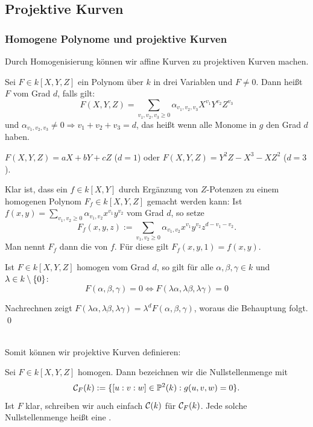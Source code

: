 \nextlecture
\newpage
\subsection{Projektive Kurven}
\subsubsection{Homogene Polynome und projektive Kurven}
\label{sub:2.3} \label{subsub:2.3.1}
	Durch Homogenisierung können wir affine Kurven zu projektiven Kurven machen. 
	\marginnote{[9]}
	
\begin{defn}
	Sei $F \in k[X,Y,Z]$ ein Polynom über $k$ in drei Variablen und $F \neq 0$. 
	Dann heißt $F$  vom Grad $d$, falls gilt:
	\[ F(X,Y,Z) = \sum_{v_1,v_2,v_3 \geq 0} \alpha_{v_1,v_2,v_3} X^{v_1} Y^{v_2} Z^{v_3} \]
	und $\alpha_{v_1,v_2,v_3} \neq 0 \Rightarrow v_1 + v_2 + v_3 = d$, das heißt wenn alle Monome in $g$ den Grad $d$ haben.
\end{defn}

\begin{bsp}
	$F(X,Y,Z) = aX + bY + cZ$ ($d=1$) oder $F(X,Y,Z) = Y^2Z-X^3-XZ^2$ ($d=3$).
\end{bsp}

\begin{bem}
	Klar ist, dass ein $f \in k[X,Y]$ durch Ergänzung von $Z$-Potenzen zu einem homogenen Polynom $F_f \in k[X,Y,Z]$ gemacht werden kann: Ist $f(x,y) = \sum_{v_1,v_2 \geq 0} \alpha_{v_1,v_2} x^{v_1} y^{v_2}$ vom Grad $d$, so setze 
	\[ F_f(x,y,z) := \sum_{v_1,v_2 \geq 0} \alpha_{v_1,v_2} x^{v_1} y^{v_2} z^{d-v_1-v_2}.\] Man nennt $F_f$ dann die  von $f$. 
	Für diese gilt $F_f(x,y,1) = f(x,y)$.
\end{bem}

\begin{lemma}
	Ist $F \in k[X,Y,Z]$ homogen vom Grad $d$, so gilt für alle $\alpha, \beta, \gamma \in k$ und $\lambda \in k \setminus \{0\}$:
	\[ F(\alpha,\beta,\gamma) = 0 \Leftrightarrow F(\lambda \alpha, \lambda \beta, \lambda \gamma) = 0\]
\end{lemma}

	Nachrechnen zeigt $F(\lambda \alpha, \lambda \beta, \lambda \gamma) = \lambda^d F(\alpha, \beta, \gamma)$, woraus die Behauptung folgt. \qed

\mbox{}\\	
Somit können wir projektive Kurven definieren:
\begin{defn}
	Sei $F \in k[X,Y,Z]$ homogen. 
	Dann bezeichnen wir die Nullstellenmenge mit
	\[ \mathcal{C}_F(k) := \{[u:v:w] \in \mathbb{P}^2(k) : g(u,v,w) = 0\}.\]
	Ist $F$ klar, schreiben wir auch einfach $\mathcal{C}(k)$ für $\mathcal{C}_F(k)$. 
	Jede solche Nullstellenmenge heißt eine .
\end{defn}

